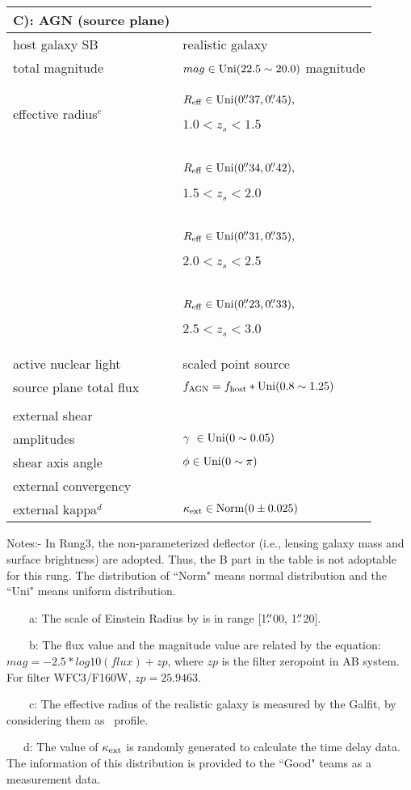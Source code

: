 \begin{table}
\begin{tabular}{ l l}
\\C): AGN (source plane) \\
\hline
host galaxy SB & realistic galaxy\\
\hline
total magnitude & $ mag \in {\rm Uni} (22.5 \sim 20.0) $ magnitude \\
effective radius$^c$ & $R_{\rm eff} \in {\rm Uni} (0\mbox{$.\!\!^{\prime\prime}$}{}37, 0\mbox{$.\!\!^{\prime\prime}$}{}45), $ {\scriptsize $1.0<z_s<1.5$ \par} \\
&$R_{\rm eff} \in {\rm Uni} (0\mbox{$.\!\!^{\prime\prime}$}{}34, 0\mbox{$.\!\!^{\prime\prime}$}{}42), $  {\scriptsize $1.5<z_s<2.0$  \par} \\
&$R_{\rm eff} \in {\rm Uni} (0\mbox{$.\!\!^{\prime\prime}$}{}31, 0\mbox{$.\!\!^{\prime\prime}$}{}35), $  {\scriptsize $2.0<z_s<2.5$  \par} \\
&$R_{\rm eff} \in {\rm Uni} (0\mbox{$.\!\!^{\prime\prime}$}{}23, 0\mbox{$.\!\!^{\prime\prime}$}{}33), $  {\scriptsize $2.5<z_s<3.0$  \par} \\
\hline
active nuclear light & scaled point source \\
\hline
source plane total flux & $f_{\rm AGN} = f_{\rm host} * {\rm Uni} (0.8 \sim 1.25) $ \\
 \\\hline \hline
external shear \\
\hline
amplitudes & $ \gamma\ \in {\rm Uni} (0 \sim 0.05) $ \\
shear axis angle & $\phi \in {\rm Uni} (0 \sim \pi) $ \\  
\hline
external convergency \\
\hline
external kappa$^d$ & $ \kappa_{\rm ext} \in {\rm Norm} (0 \pm 0.025) $ \\
\hline
\hline
\end{tabular}
  \begin{tablenotes}
 	 \footnotesize
 	 \item Notes:- In Rung3, the non-parameterized deflector (i.e., lensing galaxy mass and surface brightness) are adopted. Thus, the B part in the table is not adoptable for this rung. The distribution of ``Norm" means normal distribution and the ``Uni" means uniform distribution.
	 \item ~~~~a: The scale of Einstein Radius by is in range [1$\mbox{$.\!\!^{\prime\prime}$}$00, 1$\mbox{$.\!\!^{\prime\prime}$}$20]. 
	 \item ~~~~b: The flux value and the magnitude value are related by the equation: \\ $mag= -2.5 * log10(flux) + zp$, where $zp$ is the filter zeropoint in AB system. For filter WFC3/F160W, $zp = 25.9463$.
	 \item ~~~~c: The effective radius of the realistic galaxy is measured by the Galfit, by considering them as \sersic\ profile.
	 \item ~~~d: The value of $\kappa_{\rm ext}$ is randomly generated to calculate the time delay data. The information of this distribution is provided to the ``Good" teams as a measurement data.
  \end{tablenotes}
\end{table}

